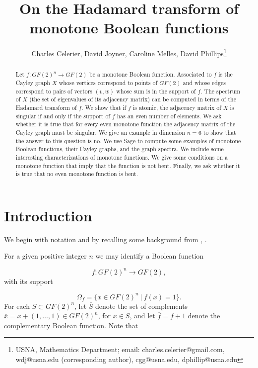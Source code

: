 \documentclass[12pt]{article}
\begin{document}
\author{Charles Celerier, David Joyner, Caroline Melles, David
  Phillips\thanks{USNA, Mathematics Department;
email: charles.celerier@gmail.com, wdj@usna.edu (corresponding author),
cgg@usna.edu, dphillip@usna.edu}}

\title{On the Hadamard transform of monotone Boolean functions}

\maketitle

\begin{abstract}
  Let $f:GF(2)^n \rightarrow GF(2)$ be a monotone Boolean function.  Associated to
  $f$ is the Cayley graph $X$ whose vertices correspond to points of $GF(2)$
  and whose edges correspond to pairs of vectors $(v,w)$ whose sum is in
  the support of $f$.  The spectrum of $X$ (the set of eigenvalues of its
  adjacency matrix) can be computed in terms of the Hadamard transform
  of $f$.  We show that if $f$ is atomic, the adjacency matrix of $X$ is
  singular if and only if the support of $f$ has an even number of
  elements.  We ask whether it is true that for every even monotone
  function the adjacency matrix of the Cayley graph must be singular.
  We give an example in dimension $n=6$ to show that the answer to this
  question is no.  We use Sage to compute some examples of monotone
  Boolean functions, their Cayley graphs, and the graph spectra.  We
  include some interesting characterizations of monotone functions.
  We give some conditions on a monotone function that imply that the
  function is not bent.  Finally, we ask whether it is true that no
  even monotone function is bent.
\end{abstract}

\section{Introduction}

We begin with notation and by recalling some background
from \cite{art:s07}, \cite{art:bc99}.

For a given positive integer $n$ we may identify a Boolean function

\[
f:GF(2)^n\to GF(2),
\]
with its support

\[
\Omega_f = \{x\in GF(2)^n\ |\ f(x)=1\}.
\]
For each $S\subset GF(2)^n$, let $\overline{S}$ denote the
set of complements $\overline{x}=x+(1,\dots,1)\in GF(2)^n$,
for $x\in S$, and let $\overline{f}=f+1$ denote the complementary
Boolean function. Note that
\end{document}
